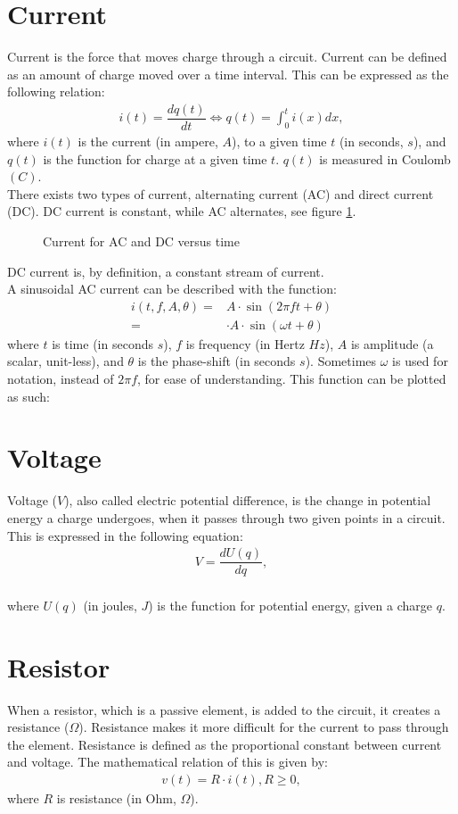 \section{Current}
Current is the force that moves charge through a circuit. Current can be defined as an amount of charge moved over a time interval. This can be expressed as the following relation:
\begin{align}
i(t)=\dfrac{dq(t)}{dt} \Leftrightarrow q(t)=\int_{0}^{t}i(x)dx,
\label{I=dq/dt}
\end{align}
where $i(t)$ is the current (in ampere, $A$), to a given time $t$ (in seconds, $s$), and $q(t)$ is the function for charge at a given time $t$. $q(t)$ is measured in Coulomb$(C)$.
\\
There exists two types of current, alternating current (AC) and direct current (DC). DC current is constant, while AC alternates, see figure \ref{fig:ACDC}. 
\begin{figure}[H] 

\caption{Current for AC and DC versus time}
\label{fig:ACDC}
\end{figure}
DC current is, by definition, a constant stream of current.
\\
A sinusoidal AC current can be described with the function: 
\begin{align*}
	i(t, f, A, \theta) =& A\cdot \sin{(2\pi ft + \theta)} \\
	=& \cdot A \cdot \sin{(\omega t + \theta)}
\end{align*}
where $t$ is time (in seconds $s$), $f$ is frequency (in Hertz $Hz$), $A$ is amplitude (a scalar, unit-less), and $\theta$ is the phase-shift (in seconds $s$).
Sometimes $\omega$ is used for notation, instead of $2\pi f$, for ease of understanding.
This function can be plotted as such:

\section{Voltage}
Voltage ($V$), also called electric potential difference, is the change in potential energy a charge undergoes, when it passes through two given points in a circuit. This is expressed in the following equation:
\begin{align}
	V=\dfrac{dU(q)}{dq},
\end{align}
\\
where $U(q)$ (in joules, $J$) is the function for potential energy, given a charge $q$.

\section{Resistor}
When a resistor, which is a passive element, is added to the circuit, it creates a resistance ($\Omega$). Resistance makes it more difficult for the current to pass through the element. Resistance is defined as the proportional constant between current and voltage. The mathematical relation of this is given by:
\begin{align} 
\label{Ohm}
v(t)=R\cdot i(t),  R\geq0,
\end{align}
where $R$ is resistance (in Ohm, $\Omega$).


